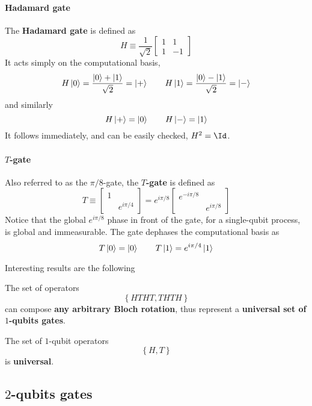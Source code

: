 \paragraph{Hadamard gate}

The \textbf{Hadamard gate} is defined as
\[
    H \equiv \frac{1}{\sqrt{2}} \begin{bmatrix}
        1 & 1  \\
        1 & -1
    \end{bmatrix}
\]
It acts simply on the computational basis,
\[
    H \ket{0} = \frac{\ket{0} + \ket{1}}{\sqrt{2}} = \ket{+}
    \qquad
    H \ket{1} = \frac{\ket{0} - \ket{1}}{\sqrt{2}} = \ket{-}
\]
and similarly
\[
    H \ket{+} = \ket{0}
    \qquad
    H \ket{-} = \ket{1}
\]
It follows immediately, and can be easily checked, $H^2 = \Id$.

\paragraph{$T$-gate} Also referred to as the $\pi/8$-gate, the \textbf{$T$-gate} is defined as
\[
    T \equiv \begin{bmatrix}
        1 & \\
          & e^{i\pi/4}
    \end{bmatrix} = e^{i\pi/8} \begin{bmatrix}
        e^{-i\pi/8} & \\
                    & e^{i\pi/8}
    \end{bmatrix}
\]
Notice that the global $e^{i\pi/8}$ phase in front of the gate, for a single-qubit process, is global and immeasurable. The gate dephases the computational basis as
\[
    T \ket{0} = \ket{0}
    \qquad
    T \ket{1} = e^{i\pi/4} \ket{1}
\]

Interesting results are the following
\begin{lemma}
    The set of operators
    \[
        \left\lbrace
            HTHT, THTH
        \right\rbrace
    \]
    can compose \textbf{any arbitrary Bloch rotation}, thus represent a \textbf{universal set of $1$-qubits gates}.
\end{lemma}
\begin{lemma}
    The set of $1$-qubit operators
    \[
        \left\lbrace 
            H, T
        \right\rbrace
    \]
    is \textbf{universal}.
\end{lemma}

\subsection{$2$-qubits gates}\label{subsec:2-qubits gates}

